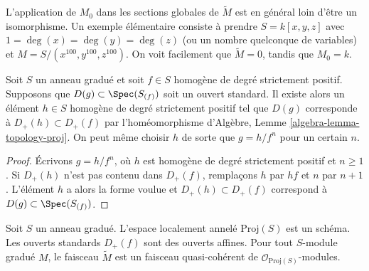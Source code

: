\begin{remark}
\label{remark-global-sections-not-isomorphism}
L'application de $M_0$ dans les sections globales de $\widetilde M$ est en
général loin d'être un isomorphisme. Un exemple élémentaire consiste à prendre
$S = k[x, y, z]$ avec $1 = \deg(x) = \deg(y) = \deg(z)$ (ou un nombre
quelconque de variables) et $M = S/(x^{100}, y^{100}, z^{100})$. On voit facilement que
$\widetilde M = 0$, tandis que $M_0 = k$.
\end{remark}

\begin{lemma}
\label{lemma-standard-open-proj}
Soit $S$ un anneau gradué et soit $f \in S$ homogène de degré strictement
positif. Supposons que $D(g) \subset \Spec(S_{(f)})$ soit un ouvert standard.
Il existe alors un élément $h \in S$ homogène de degré strictement positif tel
que $D(g)$ corresponde à $D_{+}(h) \subset D_{+}(f)$ par l'homéomorphisme
d'Algèbre, Lemme \ref{algebra-lemma-topology-proj}. On peut même choisir $h$
de sorte que $g = h/f^n$ pour un certain $n$.
\end{lemma}

\begin{proof}
Écrivons $g = h/f^n$, où $h$ est homogène de degré strictement positif et
$n \geq 1$. Si $D_{+}(h)$ n'est pas contenu dans $D_{+}(f)$, remplaçons $h$
par $hf$ et $n$ par $n + 1$. L'élément $h$ a alors la forme voulue et
$D_{+}(h) \subset D_{+}(f)$ correspond à
$D(g) \subset \Spec(S_{(f)})$.
\end{proof}

\begin{lemma}
\label{lemma-proj-scheme}
Soit $S$ un anneau gradué. L'espace
localement annelé $\text{Proj}(S)$ est un
schéma. Les ouverts standards $D_{+}(f)$
sont des ouverts affines. Pour tout
$S$-module gradué $M$, le faisceau $\widetilde M$ est un faisceau
quasi-cohérent de $\mathcal{O}_{\text{Proj}(S)}$-modules.
\end{lemma}

